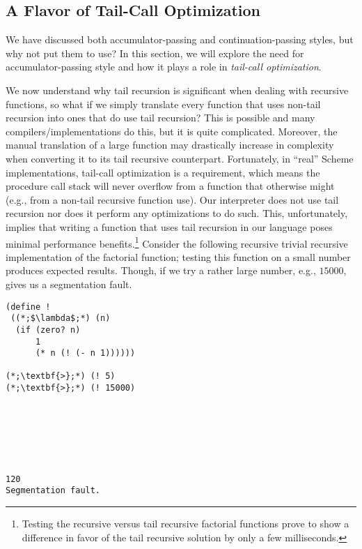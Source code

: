 \subsection*{A Flavor of Tail-Call Optimization}
We have discussed both accumulator-passing and continuation-passing styles, but why not put them to use? In this section, we will explore the need for accumulator-passing style and how it plays a role in \textit{tail-call optimization}.

We now understand why tail recursion is significant when dealing with recursive functions, so what if we simply translate every function that uses non-tail recursion into ones that do use tail recursion? This is possible and many compilers/implementations do this, but it is quite complicated. Moreover, the manual translation of a large function may drastically increase in complexity when converting it to its tail recursive counterpart. Fortunately, in ``real'' Scheme implementations, tail-call optimization is a requirement, which means the procedure call stack will never overflow from a function that otherwise might (e.g., from a non-tail recursive function use). Our interpreter does not use tail recursion nor does it perform any optimizations to do such. This, unfortunately, implies that writing a function that uses tail recursion in our language poses minimal performance benefits.\footnote{Testing the recursive versus tail recursive factorial functions prove to show a difference in favor of the tail recursive solution by only a few milliseconds.} Consider the following recursive trivial recursive implementation of the factorial function; testing this function on a small number produces expected results. Though, if we try a rather large number, e.g., $15000$, gives us a segmentation fault.

\begin{cloast}[]{}
\begin{lstlisting}[language=MyScheme]
(define !
 ((*;$\lambda$;*) (n)
  (if (zero? n)
      1
      (* n (! (- n 1))))))

(*;\textbf{>};*) (! 5)
(*;\textbf{>};*) (! 15000)
\end{lstlisting}
\tcblower
\begin{lstlisting}[language=MyOutput]






120
Segmentation fault.
\end{lstlisting}
\end{cloast}

